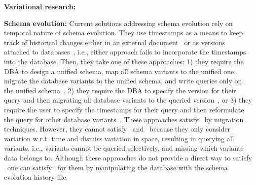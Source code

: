 




\textbf{Variational research:}

\textbf{Schema evolution:}
%
Current solutions addressing schema evolution rely on
temporal nature of schema evolution. They use timestamps as a 
means to keep track of historical changes either in an external document~\cite{prima08Moon}
or as versions attached to 
databases~\cite{SchEvolRA90McKenzie, schVersioning97Castro, tempSchEvol91Ariav, tsql95Snodgrass}, 
i.e., either approach fails to incorporate
the timestamps into the database. 
Then, they take one of these approaches:
1) they require the DBA to design a unified schema, map all schema variants
to the unified one, migrate the database variants to the unified schema, and
write queries only on the unified schema~\cite{schEvolUnifyApp},
2) they require the DBA to specify the version for their query and then migrating
all database variants to the queried 
version~\cite{SchEvolRA90McKenzie, schVersioning97Castro, tempSchEvol91Ariav, tsql95Snodgrass},
or 3) they require the user to specify the timestamps for their query and
then reformulate the query for other database variants~\cite{prima08Moon}.
%
These approaches satisfy \nZero\ by migration techniques.
However, they cannot satisfy \nOne\ and \nTwo\ because they
only consider variation w.r.t. time and dismiss variation in space,
resulting in querying all variants, i.e., variants cannot be queried
selectively, and missing which variants data belongs to.
Although these approaches do not provide a direct way to satisfy \nThree\
one can satisfy \nThree\ for them by manipulating the database with the schema evolution history file.

